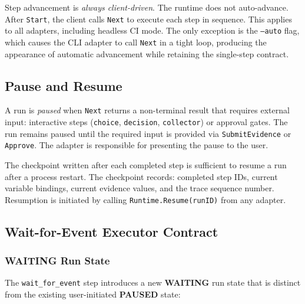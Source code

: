 Step advancement is \emph{always client-driven}. The runtime does not auto-advance.
After \texttt{Start}, the client calls \texttt{Next} to execute each step in sequence.
This applies to all adapters, including headless CI mode. The only exception is the
\texttt{--auto} flag, which causes the CLI adapter to call \texttt{Next} in a tight loop,
producing the appearance of automatic advancement while retaining the single-step contract.

\subsection{Pause and Resume}

A run is \emph{paused} when \texttt{Next} returns a non-terminal result that requires external
input: interactive steps (\texttt{choice}, \texttt{decision}, \texttt{collector}) or approval
gates. The run remains paused until the required input is provided via \texttt{SubmitEvidence}
or \texttt{Approve}. The adapter is responsible for presenting the pause to the user.

The checkpoint written after each completed step is sufficient to resume a run after a
process restart. The checkpoint records: completed step IDs, current variable bindings,
current evidence values, and the trace sequence number. Resumption is initiated by calling
\texttt{Runtime.Resume(runID)} from any adapter.

\subsection{Wait-for-Event Executor Contract}
\label{sec:wait_for_event_contract}

\subsubsection*{WAITING Run State}

The \texttt{wait\_for\_event} step introduces a new \textbf{WAITING} run state that is distinct
from the existing user-initiated \textbf{PAUSED} state:

